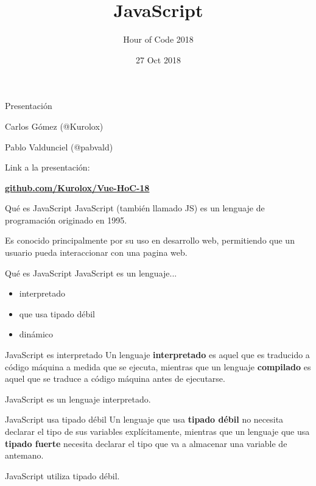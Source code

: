 \documentclass{beamer}
\title{JavaScript}
\subtitle{Hour of Code 2018}
\institute{Universidad de Valladolid}
\date{27 Oct 2018}
\begin{document}
\begin{frame}
        \maketitle
\end{frame}
    \setlength{\parskip}{\baselineskip}%
    \setlength{\parindent}{0pt}%

\begin{frame}{Presentación}
\centering
{\Large Carlos Gómez (@Kurolox)

Pablo Valdunciel (@pabvald)\bigskip

 Link a la presentación:}

\centering\textbf{\hyperlink{https://github.com/Kurolox/Vue-HoC-18}{\Large github.com/Kurolox/Vue-HoC-18}}
\end{frame}
\begin{frame}{Qué es JavaScript}
    	\pause
        JavaScript (también llamado JS) es un lenguaje de programación originado en 1995.\pause

    	Es conocido principalmente por su uso en desarrollo web, permitiendo que un usuario pueda interaccionar con una pagina web.
\end{frame}
\begin{frame}{Qué es JavaScript}
        JavaScript es un lenguaje... \bigskip
        \begin{itemize}
            \item interpretado\pause
            \item que usa tipado débil\pause
            \item dinámico
    \end{itemize}
\end{frame}
    
\begin{frame}{JavaScript es interpretado}
        \pause
        Un lenguaje \textbf{interpretado} es aquel que es traducido a código máquina a medida que se ejecuta, mientras que un lenguaje \textbf{compilado} es aquel que se traduce a código máquina antes de ejecutarse.\pause
        \centering
        
        JavaScript es un lenguaje interpretado.
\end{frame}
    
\begin{frame}{JavaScript usa tipado débil}
        \pause
        Un lenguaje que usa \textbf{tipado débil} no necesita declarar el tipo de sus variables explícitamente, mientras que un lenguaje que usa \textbf{tipado fuerte} necesita declarar el tipo que va a almacenar una variable de antemano.\pause
        \centering
        
        JavaScript utiliza tipado débil.
\end{frame}
    
\end{document}
